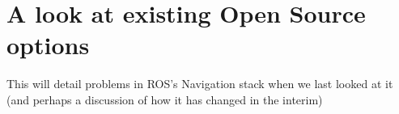 \section{A look at existing Open Source options}

This will detail problems in ROS's Navigation stack when we last looked at it (and perhaps a discussion of how it has changed in the interim)
